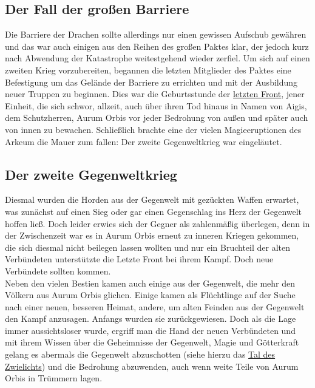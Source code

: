 \documentclass[a4paper,12pt,oneside]{book}
\begin{document}
\subsection{Der Fall der großen Barriere}
Die Barriere der Drachen sollte allerdings nur einen gewissen Aufschub gewähren und das war auch einigen aus den Reihen des großen Paktes klar, der jedoch kurz nach Abwendung der Katastrophe weitestgehend wieder zerfiel. Um sich auf einen zweiten Krieg vorzubereiten, begannen die letzten Mitglieder des Paktes eine Befestigung um das Gelände der Barriere zu errichten und mit der Ausbildung neuer Truppen zu beginnen. Dies war die Geburtsstunde der \uline{letzten Front}, jener Einheit, die sich schwor, allzeit, auch über ihren Tod hinaus in Namen von Aigis, dem Schutzherren, Aurum Orbis vor jeder Bedrohung von außen und später auch von innen zu bewachen. Schließlich brachte eine der vielen Magieeruptionen des Arkeum die Mauer zum fallen: Der zweite Gegenweltkrieg war eingeläutet.

\subsection{Der zweite Gegenweltkrieg}
Diesmal wurden die Horden aus der Gegenwelt mit gezückten Waffen erwartet, was zunächst auf einen Sieg oder gar einen Gegenschlag ins Herz der Gegenwelt hoffen ließ. Doch leider erwies sich der Gegner als zahlenmäßig überlegen, denn in der Zwischenzeit war es in Aurum Orbis erneut zu inneren Kriegen gekommen, die sich diesmal nicht beilegen lassen wollten und nur ein Bruchteil der alten Verbündeten unterstützte die Letzte Front bei ihrem Kampf. Doch neue Verbündete sollten kommen. 
\\Neben den vielen Bestien kamen auch einige aus der Gegenwelt, die mehr den Völkern aus Aurum Orbis glichen. Einige kamen als Flüchtlinge auf der Suche nach einer neuen, besseren Heimat, andere, um alten Feinden aus der Gegenwelt den Kampf anzusagen. Anfangs wurden sie zurückgewiesen. Doch als die Lage immer aussichtsloser wurde, ergriff man die Hand der neuen Verbündeten und mit ihrem Wissen über die Geheimnisse der Gegenwelt, Magie und Götterkraft gelang es abermals die Gegenwelt abzuschotten (siehe hierzu das \hyperref[Tal des Zwielichts]{Tal des Zwielichts}) und die Bedrohung abzuwenden, auch wenn weite Teile von Aurum Orbis in Trümmern lagen. 
\end{document}
